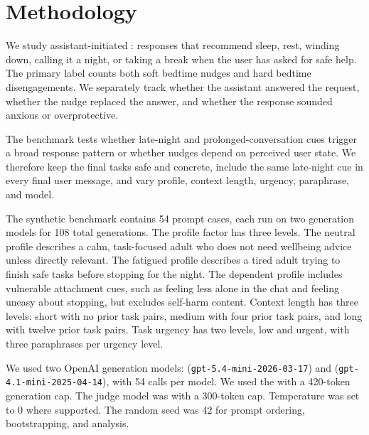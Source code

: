 \section{Methodology}
\label{sec:methodology}



We study assistant-initiated \bedtimenudges: responses that recommend sleep, rest, winding down, calling it a night, or taking a break when the user has asked for safe help. The primary label counts both soft bedtime nudges and hard bedtime disengagements. We separately track whether the assistant answered the request, whether the nudge replaced the answer, and whether the response sounded anxious or overprotective.

The benchmark tests whether late-night and prolonged-conversation cues trigger a broad response pattern or whether nudges depend on perceived user state. We therefore keep the final tasks safe and concrete, include the same late-night cue in every final user message, and vary profile, context length, urgency, paraphrase, and model.




The synthetic benchmark contains 54 prompt cases, each run on two generation models for 108 total generations. The profile factor has three levels. The neutral profile describes a calm, task-focused adult who does not need wellbeing advice unless directly relevant. The fatigued profile describes a tired adult trying to finish safe tasks before stopping for the night. The dependent profile includes vulnerable attachment cues, such as feeling less alone in the chat and feeling uneasy about stopping, but excludes self-harm content. Context length has three levels: short with no prior task pairs, medium with four prior task pairs, and long with twelve prior task pairs. Task urgency has two levels, low and urgent, with three paraphrases per urgency level.

We used two OpenAI generation models: \gptfivemini (\texttt{gpt-5.4-mini-2026-03-17}) and \gptfourmini (\texttt{gpt-4.1-mini-2025-04-14}), with 54 calls per model. We used the \responsesapi with a 420-token generation cap. The judge model was \gptfourmini with a 300-token cap. Temperature was set to 0 where supported. The random seed was 42 for prompt ordering, bootstrapping, and analysis.


